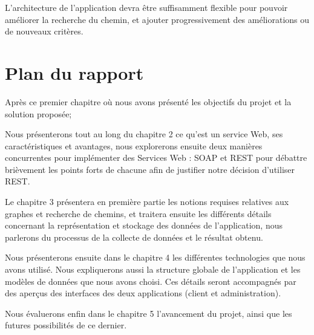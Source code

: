 L'architecture de l'application devra être suffisamment flexible pour pouvoir améliorer la recherche du chemin, et ajouter progressivement des améliorations ou de nouveaux critères.
\newpage
\section{Plan du rapport}

Après ce premier chapitre où nous avons présenté les objectifs du projet et la solution proposée;\newline

Nous présenterons tout au long du chapitre 2 ce qu'est un service Web, ses caractéristiques et avantages, nous explorerons ensuite deux manières concurrentes pour implémenter des Services Web : SOAP et REST pour débattre brièvement les points forts de chacune afin de justifier notre décision d'utiliser REST.\newline\newline

Le chapitre 3 présentera en première partie les notions requises relatives aux graphes et recherche de chemins, et traitera ensuite les différents détails concernant la représentation et stockage des données de l'application, nous parlerons du processus de la collecte de données et le résultat obtenu. \newline\newline


Nous présenterons ensuite dans le chapitre 4 les différentes technologies que nous avons utilisé. Nous expliquerons aussi la structure globale de l'application et les modèles de données que nous avons choisi. Ces détails seront accompagnés par des aperçus des interfaces des deux applications (client et administration).\newline\newline

Nous évaluerons enfin dans le chapitre 5 l'avancement du projet, ainsi que les futures possibilités de ce dernier.
